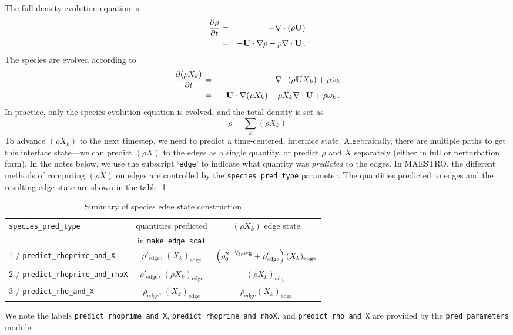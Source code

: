 The full density evolution equation is
\begin{eqnarray}
\frac{\partial\rho}{\partial t} &=& -\nabla\cdot(\rho{\bf U}) \nonumber \\
&=& -{\bf U}\cdot\nabla\rho - \rho\nabla\cdot{\bf U} \, . \label{rho equation}
\end{eqnarray}
The species are evolved according to
\begin{eqnarray}
\frac{\partial(\rho X_k)}{\partial t} &=& -\nabla\cdot(\rho{\bf U} X_k) + \rho \dot{\omega}_k \nonumber \\
&=& -{\bf U}\cdot\nabla(\rho X_k) - \rho X_k \nabla\cdot{\bf U} + \rho \dot{\omega}_k \, . \label{species equation}
\end{eqnarray}
In practice, only the species evolution equation is evolved, and the
total density is set as
\begin{equation}
\rho = \sum_k (\rho X_k)
\end{equation}
To advance $(\rho X_k)$ to the next timestep, we need to predict a
time-centered, interface state.  Algebraically, there are multiple
paths to get this interface state---we can predict $(\rho X)$ to the
edges as a single quantity, or predict $\rho$ and $X$ separately
(either in full or perturbation form).  In the notes below, we use the
subscript `{\tt edge}' to indicate what quantity was {\em predicted} to the
edges.  In MAESTRO, the different methods of computing $(\rho X)$ on
edges are controlled by the {\tt species\_pred\_type} parameter.  The
quantities predicted to edges and the 
resulting edge state are shown in the table~\ref{table:pred:species}

\begin{table}[h]
\centering
\caption{Summary of species edge state construction}
\label{table:pred:species}
\renewcommand{\arraystretch}{1.5}
\begin{tabular}{l|c|c}
\hline
\hline
{\tt species\_pred\_type} &   {quantities predicted} & {$(\rho X_k)$ edge state} \\[-5pt]
 & {in {\tt make\_edge\_scal}} & \\
\hline 
1 / {\tt predict\_rhoprime\_and\_X}  &  
  $\rho'_\mathrm{edge}$, $(X_k)_\mathrm{edge}$ &
  $\left(\rho_0^{n+\myhalf,{\rm avg}}  
  + \rho'_\mathrm{edge} \right)(X_k)_\mathrm{edge}$ \\
2 / {\tt predict\_rhoprime\_and\_rhoX}  &  
  $\rho'_\mathrm{edge}$, $(\rho X_k)_\mathrm{edge}$ &
  $(\rho X_k)_\mathrm{edge}$ \\
3 / {\tt predict\_rho\_and\_X}  &  
  $\rho_\mathrm{edge}$, $(X_k)_\mathrm{edge}$ &
  $\rho_\mathrm{edge} (X_k)_\mathrm{edge}$ \\
\hline
\end{tabular}
\end{table}
We note the labels {\tt predict\_rhoprime\_and\_X}, {\tt predict\_rhoprime\_and\_rhoX}, and
{\tt predict\_rho\_and\_X} are provided by the {\tt pred\_parameters}
module.




